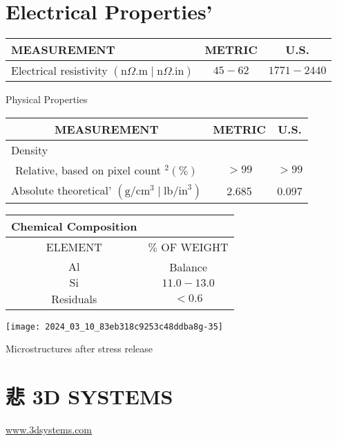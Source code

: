 \documentclass[10pt]{article}
\begin{document}
\section*{Electrical Properties'}
\begin{center}
\begin{tabular}{|lcc|}
\hline
MEASUREMENT & METRIC & U.S. \\
\hline
Electrical resistivity $(\mathrm{n} \Omega . \mathrm{m} \mid \mathrm{n} \Omega . \mathrm{in})$ & $45-62$ & $1771-2440$ \\
\hline
\end{tabular}
\end{center}

Physical Properties

\begin{center}
\begin{tabular}{|c|c|c|}
\hline
MEASUREMENT & METRIC & U.S. \\
\hline
\multicolumn{3}{|l|}{Density} \\
\hline
Relative, based on pixel count ${ }^{2}(\%)$ & $>99$ & $>99$ \\
\hline
Absolute theoretical' $\left(\mathrm{g} / \mathrm{cm}^{3} \mid \mathrm{lb} / \mathrm{in}^{3}\right)$ & 2.685 & 0.097 \\
\hline
\end{tabular}
\end{center}

\begin{center}
\begin{tabular}{|c|c|}
\hline
Chemical Composition &  \\
\hline
ELEMENT & $\%$ OF WEIGHT \\
$\mathrm{Al}$ & Balance \\
$\mathrm{Si}$ & $11.0-13.0$ \\
Residuals & $<0.6$ \\
\end{tabular}
\end{center}

\begin{center}
\texttt{[image: 2024\_03\_10\_83eb318c9253c48ddba8g-35]}
\end{center}

Microstructures after stress release

\section*{悲 3D SYSTEMS}
\href{http://www.3dsystems.com}{www.3dsystems.com}
\end{document}
